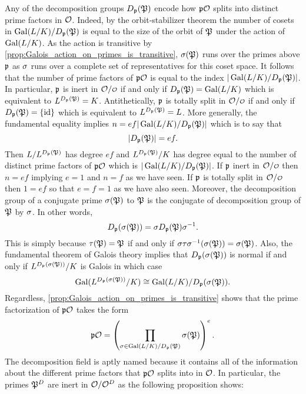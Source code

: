     Any of the decomposition groups $D_{\mathfrak{p}}(\mathfrak{P})$ encode how $\mathfrak{p}\mathcal{O}$ splits into distinct prime factors in $\mathcal{O}$. Indeed, by the orbit-stabilizer theorem the number of cosets in $\operatorname{\mathrm{Gal}}(L/K)/D_{\mathfrak{p}}(\mathfrak{P})$ is equal to the size of the orbit of $\mathfrak{P}$ under the action of $\operatorname{\mathrm{Gal}}(L/K)$. As the action is transitive by \cref{prop:Galois_action_on_primes_is_transitive}, $\sigma(\mathfrak{P})$ runs over the primes above $\mathfrak{p}$ as $\sigma$ runs over a complete set of representatives for this coset space. It follows that the number of prime factors of $\mathfrak{p}\mathcal{O}$ is equal to the index $|\operatorname{\mathrm{Gal}}(L/K)/D_{\mathfrak{p}}(\mathfrak{P})|$. In particular, $\mathfrak{p}$ is inert in $\mc{O}/\smc{O}$ if and only if $D_{\mathfrak{p}}(\mathfrak{P}) = \operatorname{\mathrm{Gal}}(L/K)$ which is equivalent to $L^{D_{\mathfrak{p}}(\mathfrak{P})} = K$. Antithetically, $\mathfrak{p}$ is totally split in $\mc{O}/\smc{O}$ if and only if $D_{\mathfrak{p}}(\mathfrak{P}) = \{\operatorname{\textrm{id}}\}$ which is equivalent to $L^{D_{\mathfrak{p}}(\mathfrak{P})} = L$. More generally, the fundamental equality implies $n = ef|\operatorname{\mathrm{Gal}}(L/K)/D_{\mathfrak{p}}(\mathfrak{P})|$ which is to say that
    \begin{equation}\label{equ:decomposition_group_e_f_relation}
      |D_{\mathfrak{p}}(\mathfrak{P})| = ef.
    \end{equation}
    Then $L/L^{D_{\mathfrak{p}}(\mathfrak{P})}$ has degree $ef$ and $L^{D_{\mathfrak{p}}(\mathfrak{P})}/K$ has degree equal to the number of distinct prime factors of $\mathfrak{p}\mathcal{O}$ which is $|\operatorname{\mathrm{Gal}}(L/K)/D_{\mathfrak{p}}(\mathfrak{P})|$. If $\mathfrak{p}$ inert in $\mc{O}/\smc{O}$ then $n = ef$ implying $e = 1$ and $n = f$ as we have seen. If $\mathfrak{p}$ is totally split in $\mc{O}/\smc{O}$ then $1 = ef$ so that $e = f = 1$ as we have also seen. Moreover, the decomposition group of a conjugate prime $\sigma(\mathfrak{P})$ to $\mathfrak{P}$ is the conjugate of decomposition group of $\mathfrak{P}$ by $\sigma$. In other words,
    \[
      D_{\mathfrak{p}}(\sigma(\mathfrak{P})) = \sigma D_{\mathfrak{p}}(\mathfrak{P})\sigma^{-1}.
    \]
    This is simply because $\tau(\mathfrak{P}) = \mathfrak{P}$ if and only if $\sigma\tau\sigma^{-1}(\sigma(\mathfrak{P})) = \sigma(\mathfrak{P})$. Also, the fundamental theorem of Galois theory implies that $D_{\mathfrak{p}}(\sigma(\mathfrak{P}))$ is normal if and only if $L^{D_{\mathfrak{p}}(\sigma(\mathfrak{P}))}/K$ is Galois in which case
    \[
      \operatorname{\mathrm{Gal}}(L^{D_{\mathfrak{p}}(\sigma(\mathfrak{P}))}/K) \cong \operatorname{\mathrm{Gal}}(L/K)/D_{\mathfrak{p}}(\sigma(\mathfrak{P})).
    \]
    Regardless, \cref{prop:Galois_action_on_primes_is_transitive} shows that the prime factorization of $\mathfrak{p}\mathcal{O}$ takes the form
    \[
      \mathfrak{p}\mathcal{O} = \left(\prod_{\sigma \in \operatorname{\mathrm{Gal}}(L/K)/D_{\mathfrak{p}}(\mathfrak{P})}\sigma(\mathfrak{P})\right)^{e}.
    \]
    The decomposition field is aptly named because it contains all of the information about the different prime factors that $\mathfrak{p}\mathcal{O}$ splits into in $\mathcal{O}$. In particular, the primes $\mathfrak{P}^{D}$ are inert in $\mathcal{O}/\mathcal{O}^{D}$ as the following proposition shows:

